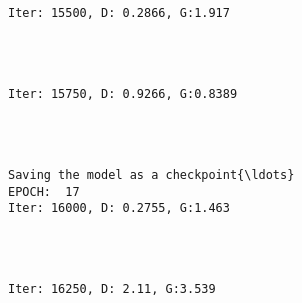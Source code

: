 \documentclass[11pt]{article}
\begin{document}
    \begin{center}
    \end{center}
    { \hspace*{\fill} \\}
    
    \begin{Verbatim}[commandchars=\\\{\}]

Iter: 15500, D: 0.2866, G:1.917
    \end{Verbatim}

    \begin{center}
    \end{center}
    { \hspace*{\fill} \\}
    
    \begin{Verbatim}[commandchars=\\\{\}]

Iter: 15750, D: 0.9266, G:0.8389
    \end{Verbatim}

    \begin{center}
    \end{center}
    { \hspace*{\fill} \\}
    
    \begin{Verbatim}[commandchars=\\\{\}]

Saving the model as a checkpoint{\ldots}
EPOCH:  17
Iter: 16000, D: 0.2755, G:1.463
    \end{Verbatim}

    \begin{center}
    \end{center}
    { \hspace*{\fill} \\}
    
    \begin{Verbatim}[commandchars=\\\{\}]

Iter: 16250, D: 2.11, G:3.539
    \end{Verbatim}
\end{document}
